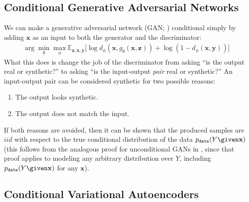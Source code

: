 \subsection{Conditional Generative Adversarial Networks}
We can make a generative adversarial network (GAN; \sect{\ref{sec:generative_models:GANs}}) conditional simply by adding $\mathbf{x}$ as an input to both the generator and the discriminator:
\begin{align}
    \arg\min_{\theta}\max_{\phi} \mathbb{E}_{\mathbf{z},\mathbf{x},\mathbf{y}} \big[ \log d_{\phi}(\mathbf{x}, g_{\theta}(\mathbf{x},\mathbf{z})) + \log (1 - d_{\phi}(\mathbf{x}, \mathbf{y})) \big]
\end{align}
What this does is change the job of the discriminator from asking ``is the output real or synthetic?'' to asking ``is the input-output \textit{pair} real or synthetic?'' An input-output pair can be considered synthetic for two possible reasons:
\begin{enumerate}
    \item The output looks synthetic.
    \item The output does not match the input.
\end{enumerate}
If both reasons are avoided, then it can be shown that the produced samples are $iid$ with respect to the true conditional distribution of the data $p_{\texttt{data}}(Y \given \mathbf{x})$ (this follows from the analogous proof for unconditional GANs in \cite{goodfellow2014generative}, since that proof applies to modeling any arbitrary distribution over $Y$, including $p_{\texttt{data}}(Y \given \mathbf{x})$ for any $\mathbf{x}$).


\subsection{Conditional Variational Autoencoders}\label{sec:conditional_generative_models:cVAE}

